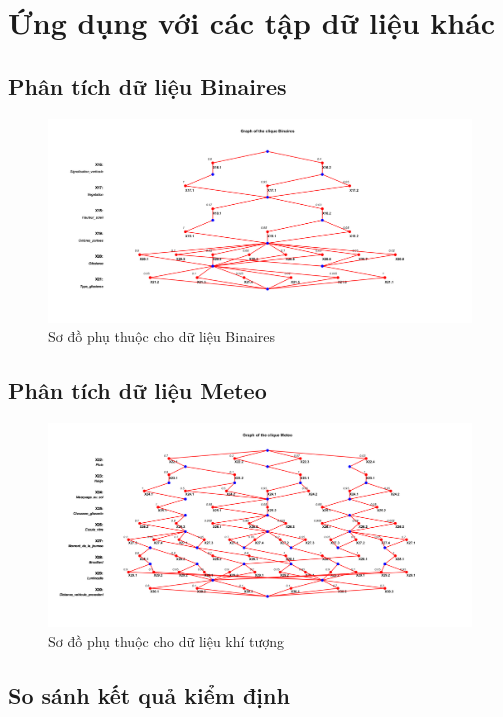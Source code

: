 \section{Ứng dụng với các tập dữ liệu khác}

\subsection{Phân tích dữ liệu Binaires}

\begin{figure}[h!]
    \centering
    \includegraphics[width=0.8\linewidth]{../../assets/images/fig_Binaires.png}
    \caption{Sơ đồ phụ thuộc cho dữ liệu Binaires}
\end{figure}

\subsection{Phân tích dữ liệu Meteo}

\begin{figure}[h!]
    \centering
    \includegraphics[width=0.8\linewidth]{../../assets/images/fig_Meteo.png}
    \caption{Sơ đồ phụ thuộc cho dữ liệu khí tượng}
\end{figure}

\subsection{So sánh kết quả kiểm định}

